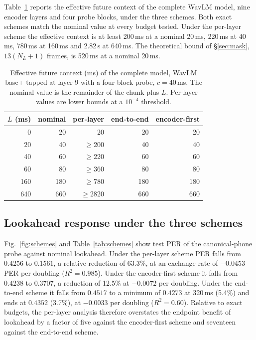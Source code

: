 \documentclass[preprint,12pt,authoryear]{elsarticle}
\begin{document}
Table~\ref{tab:reach} reports the effective future context of the complete
WavLM model, nine encoder layers and four probe blocks, under the three
schemes. Both exact schemes match the nominal value at every budget tested.
Under the per-layer scheme the effective context is at least 200\,ms at a
nominal 20\,ms, 220\,ms at 40\,ms, 780\,ms at 160\,ms and 2.82\,s at
640\,ms. The theoretical bound of \S\ref{sec:mask}, $13(N_L+1)$ frames, is
520\,ms at a nominal 20\,ms.

\begin{table}[t]
\centering\footnotesize
\setlength{\tabcolsep}{4pt}
\renewcommand{\arraystretch}{0.93}
\caption{Effective future context (ms) of the complete model, WavLM base+
tapped at layer 9 with a four-block probe, $c=40$\,ms. The nominal value is
the remainder of the chunk plus $L$. Per-layer values are lower bounds at a
$10^{-4}$ threshold.}
\label{tab:reach}
\begin{tabular}{rrrrr}
\toprule
$L$ (ms) & nominal & per-layer & end-to-end & encoder-first \\
\midrule
0   & 20  & 20          & 20  & 20 \\
20  & 40  & $\geq$200   & 40  & 40 \\
40  & 60  & $\geq$220   & 60  & 60 \\
60  & 80  & $\geq$360   & 80  & 80 \\
160 & 180 & $\geq$780   & 180 & 180 \\
640 & 660 & $\geq$2820  & 660 & 660 \\
\bottomrule
\end{tabular}
\end{table}

\subsection{Lookahead response under the three schemes}
\label{sec:schemes}

Fig.~\ref{fig:schemes} and Table~\ref{tab:schemes} show test PER of the
canonical-phone probe against nominal lookahead. Under the per-layer scheme
PER falls from $0.4256$ to $0.1561$, a relative reduction of 63.3\%, at an
exchange rate of $-0.0453$ PER per doubling ($R^2=0.985$). Under the
encoder-first scheme it falls from $0.4238$ to $0.3707$, a reduction of
12.5\% at $-0.0072$ per doubling. Under the end-to-end scheme it falls from
$0.4517$ to a minimum of $0.4273$ at 320\,ms (5.4\%) and ends at $0.4352$
(3.7\%), at $-0.0033$ per doubling ($R^2=0.60$). Relative to exact budgets,
the per-layer analysis therefore overstates the endpoint benefit of lookahead
by a factor of five against the encoder-first scheme and seventeen against
the end-to-end scheme.
\end{document}
